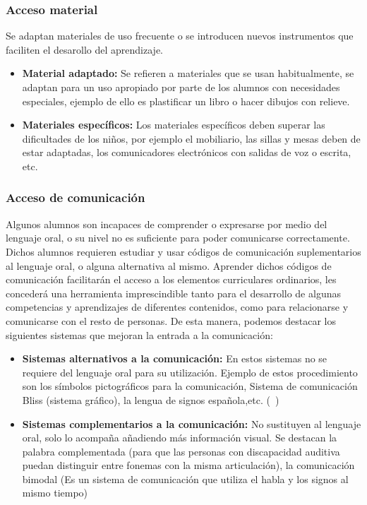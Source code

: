\subsubsection{Acceso material}
Se adaptan materiales de uso frecuente o se introducen nuevos instrumentos que faciliten el desarollo del aprendizaje.
\begin{itemize}
    \item \textbf{Material adaptado:} Se refieren a materiales que se usan habitualmente, se adaptan para un uso apropiado por parte de los alumnos con necesidades especiales, ejemplo de ello es plastificar un libro o hacer dibujos con relieve.
    \item \textbf{Materiales específicos:} Los materiales específicos deben superar las dificultades de los niños, por ejemplo el mobiliario, las sillas y mesas deben de estar adaptadas, los comunicadores electrónicos con salidas de voz o escrita, etc.
\end{itemize}

\subsubsection{Acceso de comunicación}
Algunos alumnos son incapaces de comprender o expresarse por medio del lenguaje oral, o su nivel no es suficiente para poder comunicarse correctamente. Dichos alumnos requieren estudiar y usar códigos de comunicación suplementarios al lenguaje oral, o alguna alternativa al mismo. Aprender dichos códigos de comunicación facilitarán el acceso a los elementos curriculares ordinarios, les concederá una herramienta imprescindible tanto para el desarrollo de algunas competencias y aprendizajes de diferentes contenidos, como para relacionarse y comunicarse con el resto de personas. De esta manera, podemos destacar los siguientes sistemas que mejoran la  entrada a la comunicación:
\begin{itemize}
    \item \textbf{Sistemas alternativos a la comunicación:} En estos sistemas no se requiere del lenguaje oral para su utilización. Ejemplo de estos procedimiento son los símbolos pictográficos para la comunicación, Sistema de comunicación Bliss (sistema gráfico), la lengua de signos española,etc. (~\cite{SistemaEducativo})

    \item \textbf{Sistemas complementarios a la comunicación:} No sustituyen al lenguaje oral, solo lo acompaña añadiendo más información visual. Se destacan la palabra complementada (para que las personas con discapacidad auditiva puedan distinguir entre fonemas con la misma articulación), la comunicación bimodal (Es un sistema de comunicación que utiliza el habla y los signos al mismo tiempo)
\end{itemize}

